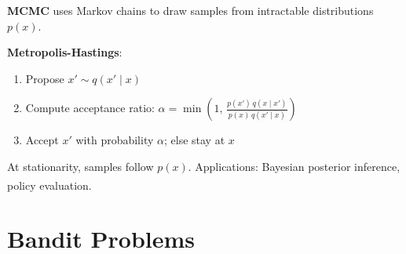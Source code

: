 \begin{tcbitemize}[ skin=sectionraster ]
        \tcbitem[title=Markov Chain Monte Carlo (MCMC), raster multicolumn=3]
        \textbf{MCMC} uses Markov chains to draw samples from intractable
        distributions $p(x)$.

        \textbf{Metropolis-Hastings}:
        \begin{enumerate}
            \item Propose $x' \sim q(x' \mid x)$
            \item Compute acceptance ratio:
                  $\alpha = \min\!\left(1,\,
                  \frac{p(x')\,q(x \mid x')}{p(x)\,q(x' \mid x)}\right)$
            \item Accept $x'$ with probability $\alpha$; else stay at $x$
        \end{enumerate}
        At stationarity, samples follow $p(x)$.
        Applications: Bayesian posterior inference, policy
        evaluation.\textsuperscript{\cite[][p.~160]{barberBayesianReasoningMachine2012}}

    \end{tcbitemize}


    \section{Bandit Problems}

